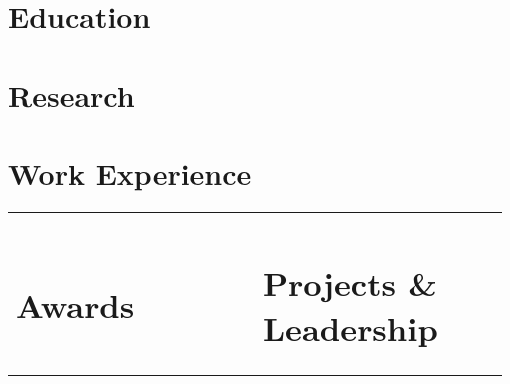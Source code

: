 \documentclass{cv}
\begin{document}

    \section{Education}
        

    \section{Research}
        
    
    \section{Work Experience}
        
        

    \hspace*{-0.9cm}
    \begin{tabular}{p{0.488\linewidth}p{0.488\linewidth}}
        \section{Awards}
            
            
            

        &

        \section{Projects \& Leadership}
            
            
            
            
    \end{tabular}
\end{document}
